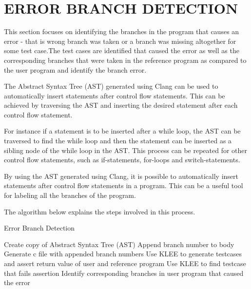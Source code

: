 \section{\uppercase{Error Branch Detection}}
This section focuses on identifying the branches in the program that causes an error - that is wrong branch was taken or a branch was missing altogether for some test case.The test cases are identified that caused the error as well as the corresponding branches that were taken in the reference program as compared to the user program and identify the branch error. 

The Abstract Syntax Tree (AST) generated using Clang can be used to automatically insert statements after control flow statements. This can be achieved by traversing the AST and inserting the desired statement after each control flow statement. 

For instance if a statement is to be inserted after a while loop, the AST can be traversed to find the while loop and then the statement can be inserted as a sibling node of the while loop in the AST. This process can be repeated for other control flow statements, such as if-statements, for-loops and switch-statements.

By using the AST generated using Clang, it is possible to automatically insert statements after control flow statements in a program. This can be a useful tool for labeling all the branches of the program.

The algorithm below explains the steps involved in this process.
\begin{algorithm}
\caption{Error Branch Detection}\label{alg:error-detection}
\begin{algorithmic}[1]
    \State Create copy of Abstract Syntax Tree (AST)
            \State Append branch number to body
        \EndIf
    \EndFor
    \State Generate c file with appended branch numbers
    \State Use KLEE to generate testcases and assert return value of user and reference program
    \State Use KLEE to find testcase that fails assertion
    \State Identify corresponding branches in user program that caused the error
\EndFor
\end{algorithmic}
\end{algorithm}